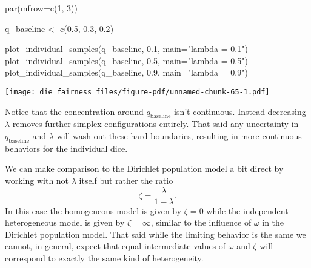 \documentclass[
  letterpaper,
  DIV=11,
  numbers=noendperiod]{scrartcl}
\newenvironment{Shaded}{\begin{snugshade}}{\end{snugshade}}
\newcommand{\AttributeTok}[1]{\textcolor[rgb]{0.40,0.45,0.13}{#1}}
\newcommand{\ConstantTok}[1]{\textcolor[rgb]{0.56,0.35,0.01}{#1}}
\newcommand{\DecValTok}[1]{\textcolor[rgb]{0.68,0.00,0.00}{#1}}
\newcommand{\FloatTok}[1]{\textcolor[rgb]{0.68,0.00,0.00}{#1}}
\newcommand{\FunctionTok}[1]{\textcolor[rgb]{0.28,0.35,0.67}{#1}}
\newcommand{\NormalTok}[1]{\textcolor[rgb]{0.00,0.23,0.31}{#1}}
\newcommand{\OtherTok}[1]{\textcolor[rgb]{0.00,0.23,0.31}{#1}}
\newcommand{\SpecialCharTok}[1]{\textcolor[rgb]{0.37,0.37,0.37}{#1}}
\newcommand{\StringTok}[1]{\textcolor[rgb]{0.13,0.47,0.30}{#1}}
\begin{document}
\begin{Shaded}
\end{Shaded}

\begin{Shaded}
\begin{Highlighting}[]
\FunctionTok{par}\NormalTok{(}\AttributeTok{mfrow=}\FunctionTok{c}\NormalTok{(}\DecValTok{1}\NormalTok{, }\DecValTok{3}\NormalTok{))}

\NormalTok{q\_baseline }\OtherTok{\textless{}{-}} \FunctionTok{c}\NormalTok{(}\FloatTok{0.5}\NormalTok{, }\FloatTok{0.3}\NormalTok{, }\FloatTok{0.2}\NormalTok{)}

\FunctionTok{plot\_individual\_samples}\NormalTok{(q\_baseline, }\FloatTok{0.1}\NormalTok{, }\AttributeTok{main=}\StringTok{"lambda = 0.1"}\NormalTok{)}
\FunctionTok{plot\_individual\_samples}\NormalTok{(q\_baseline, }\FloatTok{0.5}\NormalTok{, }\AttributeTok{main=}\StringTok{"lambda = 0.5"}\NormalTok{)}
\FunctionTok{plot\_individual\_samples}\NormalTok{(q\_baseline, }\FloatTok{0.9}\NormalTok{, }\AttributeTok{main=}\StringTok{"lambda = 0.9"}\NormalTok{)}
\end{Highlighting}
\end{Shaded}

\texttt{[image: die\_fairness\_files/figure-pdf/unnamed-chunk-65-1.pdf]}

Notice that the concentration around \(q_{\mathrm{baseline}}\) isn't
continuous. Instead decreasing \(\lambda\) removes further simplex
configurations entirely. That said any uncertainty in
\(q_{\mathrm{baseline}}\) and \(\lambda\) will wash out these hard
boundaries, resulting in more continuous behaviors for the individual
dice.

We can make comparison to the Dirichlet population model a bit direct by
working with not \(\lambda\) itself but rather the ratio \[
\zeta = \frac{ \lambda }{ 1 - \lambda }.
\] In this case the homogeneous model is given by \(\zeta = 0\) while
the independent heterogeneous model is given by \(\zeta = \infty\),
similar to the influence of \(\omega\) in the Dirichlet population
model. That said while the limiting behavior is the same we cannot, in
general, expect that equal intermediate values of \(\omega\) and
\(\zeta\) will correspond to exactly the same kind of heterogeneity.
\end{document}
